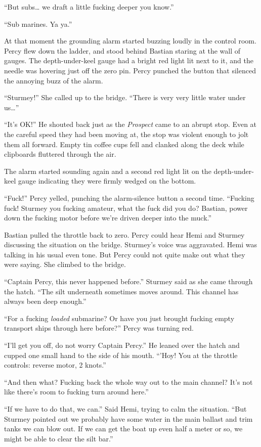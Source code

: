 \documentclass[]{scrbook}
\begin{document}
``But subs\ldots{} we draft a little fucking deeper you know.''

``Sub marines. Ya ya.''

At that moment the grounding alarm started buzzing loudly in the control
room. Percy flew down the ladder, and stood behind Bastian staring at
the wall of gauges. The depth-under-keel gauge had a bright red light
lit next to it, and the needle was hovering just off the zero pin. Percy
punched the button that silenced the annoying buzz of the alarm.

``Sturmey!'' She called up to the bridge. ``There is very very little
water under us\ldots{}''

``It's OK!'' He shouted back just as the \emph{Prospect} came to an
abrupt stop. Even at the careful speed they had been moving at, the stop
was violent enough to jolt them all forward. Empty tin coffee cups fell
and clanked along the deck while clipboards fluttered through the air.

The alarm started sounding again and a second red light lit on the
depth-under-keel gauge indicating they were firmly wedged on the bottom.

``Fuck!'' Percy yelled, punching the alarm-silence button a second time.
``Fucking fuck! Sturmey you fucking amateur, what the fuck did you do?
Bastian, power down the fucking motor before we're driven deeper into
the muck.''

Bastian pulled the throttle back to zero. Percy could hear Hemi and
Sturmey discussing the situation on the bridge. Sturmey's voice was
aggravated. Hemi was talking in his usual even tone. But Percy could not
quite make out what they were saying. She climbed to the bridge.

``Captain Percy, this never happened before.'' Sturmey said as she came
through the hatch. ``The silt underneath sometimes moves around. This
channel has always been deep enough.''

``For a fucking \emph{loaded} submarine? Or have you just brought
fucking empty transport ships through here before?'' Percy was turning
red.

``I'll get you off, do not worry Captain Percy.'' He leaned over the
hatch and cupped one small hand to the side of his mouth. ``'Hoy! You at
the throttle controls: reverse motor, 2 knots.''

``And then what? Fucking back the whole way out to the main channel?
It's not like there's room to fucking turn around here.''

``If we have to do that, we can.'' Said Hemi, trying to calm the
situation. ``But Sturmey pointed out we probably have some water in the
main ballast and trim tanks we can blow out. If we can get the boat up
even half a meter or so, we might be able to clear the silt bar.''
\end{document}
